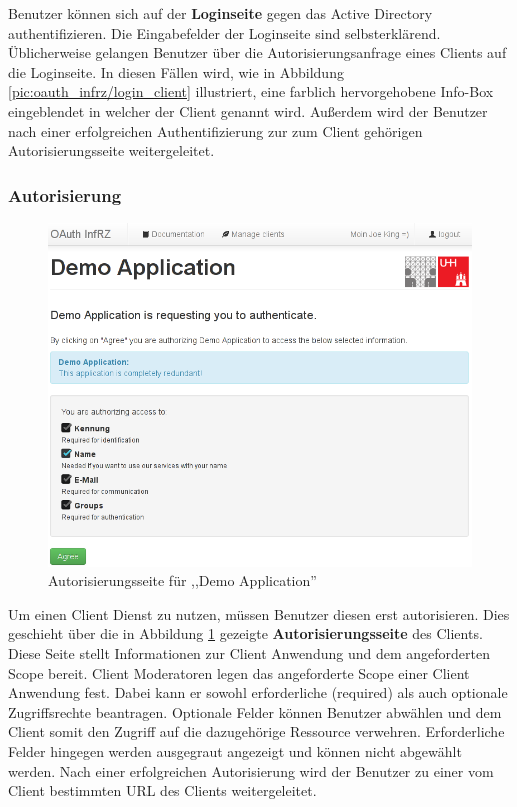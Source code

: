 \documentclass[12pt,a4paper,pointednumbers,abstracton]{scrartcl}
\begin{document}
Benutzer können sich auf der \textbf{Loginseite} gegen das Active Directory authentifizieren.
Die Eingabefelder der Loginseite sind selbsterklärend.
Üblicherweise gelangen Benutzer über die Autorisierungsanfrage eines Clients auf die Loginseite.
In diesen Fällen wird, wie in Abbildung \ref{pic:oauth_infrz/login_client} illustriert, eine farblich hervorgehobene Info-Box eingeblendet in welcher der Client genannt wird.
Außerdem wird der Benutzer nach einer erfolgreichen Authentifizierung zur zum Client gehörigen Autorisierungsseite weitergeleitet.

\subsubsection{Autorisierung}

\begin{figure}[h!]
\centering
\includegraphics[width=15cm]{img/oauth_infrz/authorize}
\caption{Autorisierungsseite für ,,Demo Application''}
\label{pic:oauth_infrz/authorize}
\end{figure}

Um einen Client Dienst zu nutzen, müssen Benutzer diesen erst autorisieren.
Dies geschieht über die in Abbildung \ref{pic:oauth_infrz/authorize} gezeigte \textbf{Autorisierungsseite} des Clients.
Diese Seite stellt Informationen zur Client Anwendung und dem angeforderten Scope bereit.
Client Moderatoren legen das angeforderte Scope einer Client Anwendung fest.
Dabei kann er sowohl erforderliche (required) als auch optionale Zugriffsrechte beantragen.
Optionale Felder können Benutzer abwählen und dem Client somit den Zugriff auf die dazugehörige Ressource verwehren.
Erforderliche Felder hingegen werden ausgegraut angezeigt und können nicht abgewählt werden.
Nach einer erfolgreichen Autorisierung wird der Benutzer zu einer vom Client bestimmten URL des Clients weitergeleitet.
\end{document}
